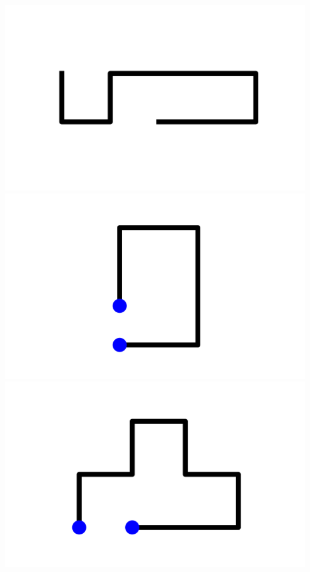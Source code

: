 \documentclass[]{report}
\begin{document}
\includegraphics[scale=.1]{pictures/18/state_cluster_shapes_19.pdf} 
\includegraphics[scale=.1]{pictures/18/state_cluster_shapes_20.pdf} 
\includegraphics[scale=.1]{pictures/18/state_cluster_shapes_21.pdf} 
\end{document}

